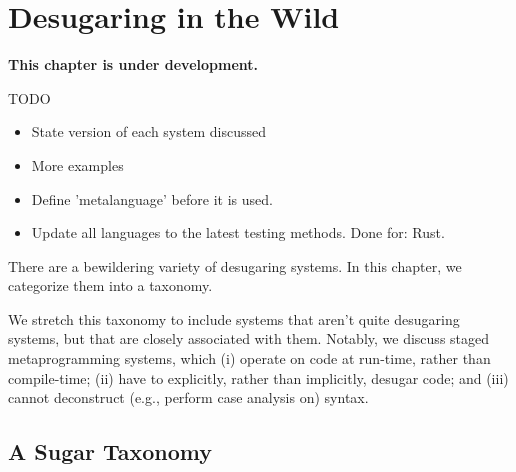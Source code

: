 \chapter{Desugaring in the Wild}\label{chap:taxonomy}

\textbf{This chapter is under development.}

TODO
\begin{itemize}
\item State version of each system discussed
\item More examples
\item Define 'metalanguage' before it is used.
\item Update all languages to the latest testing methods. Done for: Rust.
\end{itemize}

There are a bewildering variety of desugaring systems.  In this
chapter, we categorize them into a taxonomy.

We stretch this taxonomy to include systems that aren't quite
desugaring systems, but that are closely associated with
them. Notably, we discuss staged metaprogramming systems, which (i)
operate on code at run-time, rather than compile-time; (ii) have
to explicitly, rather than implicitly, desugar code; and (iii)
cannot deconstruct (e.g., perform case analysis on) syntax.

\section{A Sugar Taxonomy}

